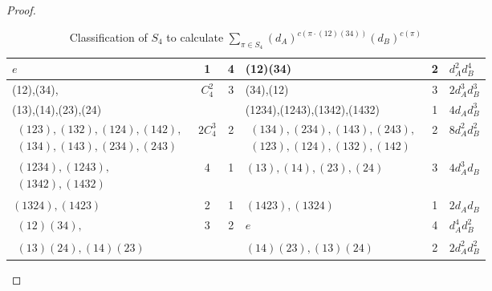 \documentclass[aps,%
twocolumn,%
floatfix,%
pra,%
amsfonts,%
groupedaddress,%
superscriptaddress]{revtex4-2}%
\newcommand{\1}{\mathbbm{1}}
\begin{document}
\begin{proof}
\begin{table}[htbp!]
\begin{tabular}{|l|c|c|l|c|l|}
        $e$ & 1 & 4 & (12)(34) & 2 & $d_A^2 d_B^4$ \\ \hline
        (12),(34), & $C_4^2$ & 3 & (34),(12) & 3 & $2 d_A^3 d_B^3$ \\ \cline{4-6}
        (13),(14),(23),(24)&  &  & (1234),(1243),(1342),(1432) & 1 & $4 d_A d_B^3$ \\ \hline
        $\substack{(123),(132),(124),(142),\\(134),(143),(234),(243)}$& $2C_4^3$ & 2 & $\substack{(134),(234),(143),(243),\\(123),(124),(132),(142)}$ & 2 & $8 d_A^2 d_B^2$ \\ \hline
        $\substack{(1234),(1243),\\(1342),(1432)}$ & 4 & 1 & $(13),(14),(23),(24)$ & 3 & $4 d_A^3 d_B$ \\ \hline
        $(1324),(1423)$ & 2 & 1 & $(1423),(1324)$ & 1 & $2 d_A d_B$ \\ \hline
        $\substack{(12)(34),}$ & 3 & 2 & $e$ & 4 & $d_A^4 d_B^2$ \\ \cline{4-6}
         $\substack{(13)(24),(14)(23)}$& & & $(14)(23),(13)(24)$ & 2 & $2 d_A^2 d_B^2$ \\ \hline
        \end{tabular}
        \caption{Classification of $S_4$ to calculate $\sum_{\pi \in S_4}(d_A)^{c(\pi \cdot (12)(34))}(d_B)^{c(\pi)}$ }
        \label{tab:S4_terms}
        \end{table}
\end{proof}
\end{document}
